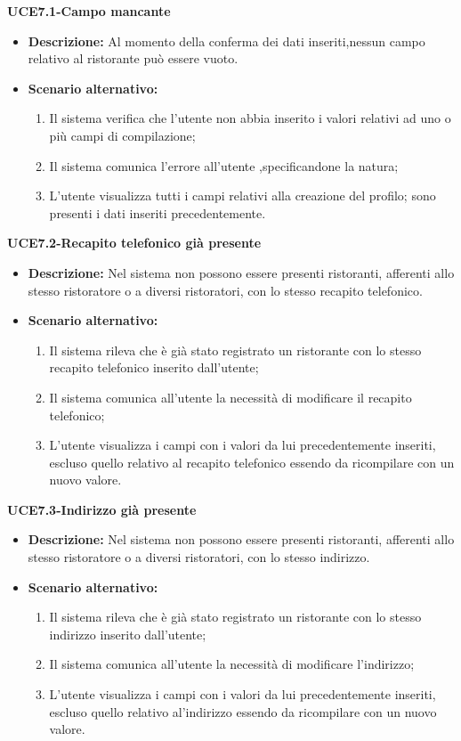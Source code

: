 \textbf{UCE7.1-Campo mancante}
\begin{itemize}
    \item \textbf{Descrizione: }Al momento della conferma dei dati inseriti,nessun campo relativo al ristorante può essere vuoto.
    \item \textbf{Scenario alternativo:}
    \begin{enumerate}
        \item Il sistema verifica che l'utente non abbia inserito i valori relativi ad uno o più campi di
        compilazione;
        \item Il sistema comunica l'errore all'utente ,specificandone la natura;
        \item L'utente visualizza tutti i campi relativi alla creazione del profilo; sono presenti i dati inseriti precedentemente.
    \end{enumerate}
\end{itemize}

\textbf{UCE7.2-Recapito telefonico già presente}
\begin{itemize}
    \item \textbf{Descrizione: }Nel sistema non possono essere presenti ristoranti, afferenti allo stesso ristoratore
    o a diversi ristoratori, con lo stesso recapito telefonico.
    \item \textbf{Scenario alternativo:}
    \begin{enumerate}
        \item Il sistema rileva che è già stato registrato un ristorante con lo stesso recapito telefonico
        inserito dall'utente;
        \item Il sistema comunica all'utente la necessità di modificare il recapito telefonico;
        \item L'utente visualizza i campi con i valori da lui precedentemente inseriti, escluso quello relativo al recapito telefonico
        essendo da ricompilare con un nuovo valore.
    \end{enumerate}
\end{itemize}

\textbf{UCE7.3-Indirizzo già presente}
\begin{itemize}
    \item \textbf{Descrizione: }Nel sistema non possono essere presenti ristoranti, afferenti allo stesso ristoratore
    o a diversi ristoratori, con lo stesso indirizzo.
    \item \textbf{Scenario alternativo:}
    \begin{enumerate}
        \item Il sistema rileva che è già stato registrato un ristorante con lo stesso indirizzo
        inserito dall'utente;
        \item Il sistema comunica all'utente la necessità di modificare l'indirizzo;
        \item L'utente visualizza i campi con i valori da lui precedentemente inseriti, escluso quello relativo al'indirizzo
        essendo da ricompilare con un nuovo valore.
    \end{enumerate}
\end{itemize}

